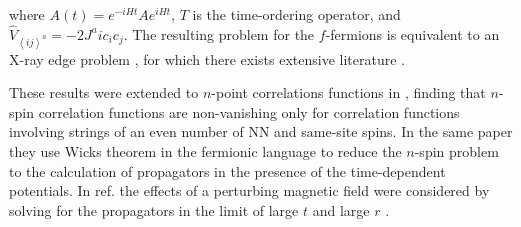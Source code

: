 \documentclass[aps,pra,preprint,groupedaddress]{revtex4-1}
\newcommand{\1}{\mathds{1}}
\begin{document}
where $A(t) = e^{-iHt} A e^{iHt}$, $T$ is the time-ordering operator, and $\hat{V}_{\left<ij\right>^a} = -2J^a ic_i c_j$. %
The resulting problem for the $f$-fermions is equivalent to an X-ray edge problem \cite{Baskaran,Knolle}, for which there exists extensive literature \cite{Gogolin,Mahan,Noz1,Noz2,Noz3}. 

These results were extended to $n$-point correlations functions in  , finding that $n$-spin correlation functions are non-vanishing only for correlation functions involving strings of an even number of NN and same-site spins. In the same paper they use Wicks theorem in the fermionic language to reduce the $n$-spin problem to the calculation of propagators in the presence of the time-dependent potentials.  %
In ref.  the effects of a perturbing magnetic field were considered by solving for the propagators in the limit of large $t$ and large $r$ \cite{Tikhonov}.  
\end{document}
